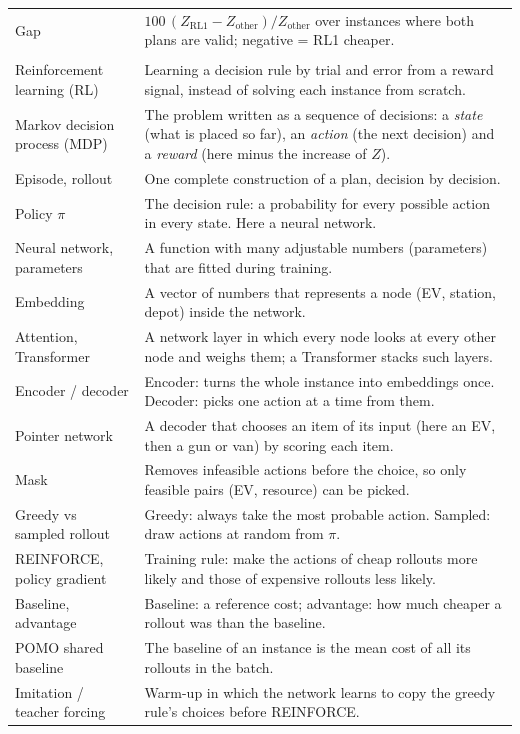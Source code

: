 \documentclass[11pt,a4paper]{article}
\begin{document}
\begin{xltabular}{\textwidth}{@{}>{\raggedright\arraybackslash}p{4.0cm}X@{}}
Gap & $100\,(Z_{\mathrm{RL1}}-Z_{\mathrm{other}})/Z_{\mathrm{other}}$ over instances where both plans are valid; negative = RL1 cheaper. \\
 \\
Reinforcement learning (RL) & Learning a decision rule by trial and error from a reward signal, instead of solving each instance from scratch. \\
Markov decision process (MDP) & The problem written as a sequence of decisions: a \emph{state} (what is placed so far), an \emph{action} (the next decision) and a \emph{reward} (here minus the increase of $Z$). \\
Episode, rollout & One complete construction of a plan, decision by decision. \\
Policy $\pi$ & The decision rule: a probability for every possible action in every state. Here a neural network. \\
Neural network, parameters & A function with many adjustable numbers (parameters) that are fitted during training. \\
Embedding & A vector of numbers that represents a node (EV, station, depot) inside the network. \\
Attention, Transformer & A network layer in which every node looks at every other node and weighs them; a Transformer stacks such layers. \\
Encoder / decoder & Encoder: turns the whole instance into embeddings once. Decoder: picks one action at a time from them. \\
Pointer network & A decoder that chooses an item of its input (here an EV, then a gun or van) by scoring each item. \\
Mask & Removes infeasible actions before the choice, so only feasible pairs (EV, resource) can be picked. \\
Greedy vs sampled rollout & Greedy: always take the most probable action. Sampled: draw actions at random from $\pi$. \\
REINFORCE, policy gradient & Training rule: make the actions of cheap rollouts more likely and those of expensive rollouts less likely. \\
Baseline, advantage & Baseline: a reference cost; advantage: how much cheaper a rollout was than the baseline. \\
POMO shared baseline & The baseline of an instance is the mean cost of all its rollouts in the batch. \\
Imitation / teacher forcing & Warm-up in which the network learns to copy the greedy rule's choices before REINFORCE. \\

\end{xltabular}
\end{document}
